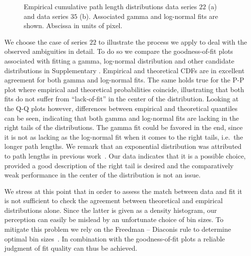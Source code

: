 		\begin{figure}
			\centering

			\caption[Path length distributions.]{Empirical cumulative path length distributions data series $22$ (a) and data series $35$ (b). Associated gamma and log-normal fits are shown. Abscissa in units of pixel.}
			\label{fig:path_lengths}
		\end{figure}

		We choose the case of series $22$ to illustrate the process we apply to deal with the observed ambiguities in detail. To do so we compare the goodness-of-fit plots associated with fitting a gamma, log-normal distribution and other candidate distributions in Supplementary . Empirical and theoretical CDFs are in excellent agreement for both gamma and log-normal fits. The same holds true for the P-P plot where empirical and theoretical probabilities coincide, illustrating that both fits do not suffer from ``lack-of-fit'' in the center of the distribution. Looking at the Q-Q plots however, differences between empirical and theoretical quantiles can be seen, indicating that both gamma and log-normal fits are lacking in the right tails of the distributions. The gamma fit could be favored in the end, since it is not as lacking as the log-normal fit when it comes to the right tails, i.e.\ the longer path lengths. We remark that an exponential distribution was attributed to path lengths in previous work~\cite{baumgarten2010plasmodial}. Our data indicates that it is a possible choice, provided a good description of the right tail is desired and the comparatively weak performance in the center of the distribution is not an issue.

		We stress at this point that in order to assess the match between data and fit it is not sufficient to check the agreement between theoretical and empirical distributions alone. Since the latter is given as a density histogram, our perception can easily be mislead by an unfortunate choice of bin sizes. To mitigate this problem we rely on the Freedman – Diaconis rule to determine optimal bin sizes~\cite{freedman1981histogram}. In combination with the goodness-of-fit plots a reliable judgment of fit quality can thus be achieved. 

